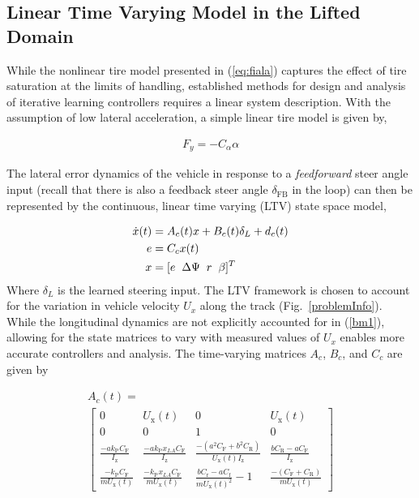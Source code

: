 \documentclass[letterpaper, 10 pt, conference]{ieeeconf}  %
\begin{document}
\subsection{Linear Time Varying Model in the Lifted Domain}

While the nonlinear tire model presented in (\ref{eq:fiala}) captures the effect of tire saturation at the limits of handling, established methods for design and analysis
of iterative learning controllers requires a linear system description. With the assumption of low lateral acceleration, a simple linear tire model is given by, 

\begin{align}
	F_y = -C_\alpha\alpha
\end{align}

The lateral error dynamics of the vehicle in response to a \textit{feedforward} steer angle input (recall that there is also a feedback steer angle $\delta_\mathrm{FB}$ in the loop)
 can then be represented by the continuous, linear time varying (LTV) state space model,

\begin{subequations}
\label{eq:cts}
\begin{align}
	\dot{x}(t) &= A_c(t) x + B_c(t)\delta_L + d_c(t)\\
	 e &= C_cx(t)\\
	 x &= [e \hspace{2mm} \Delta\Psi \hspace{2mm} r \hspace{2mm} \beta]^T
\end{align}
\end{subequations}
Where $\delta_L$ is the learned steering input. The LTV framework is chosen to account for the variation in vehicle 
velocity $U_x$ along the track (Fig.~\ref{problemInfo}). While the longitudinal dynamics are not explicitly accounted for in (\ref{bm1}), 
allowing for the state matrices to vary with measured values of $U_x$ enables more accurate controllers and analysis. The time-varying matrices $A_c$, $B_c$, and $C_c$ are given by

\begin{multline}
\label{eqn:Amatrix}
A_c(t)  =  \\
\left[\begin{smallmatrix}
  0 & U_\mathrm{x}(t) & 0 & U_\mathrm{x}(t) \\ 
  0 & 0 & 1 & 0 \\ 
  \frac{-ak_\mathrm{P} C_\mathrm{F}}{I_\mathrm{z}}  & \frac{-ak_\mathrm{P}x_{LA}C_\mathrm{F}}{I_\mathrm{z}}  & \frac{-(a^2C_\mathrm{F}+b^2C_\mathrm{R})}{U_\mathrm{x}(t)I_\mathrm{z}} & \frac{bC_\mathrm{R} - aC_\mathrm{F}}{I_\mathrm{z}}  \\
  \frac{-k_\mathrm{P}C_\mathrm{F}}{mU_\mathrm{x}(t)}  & \frac{-k_\mathrm{P}x_{LA}C_\mathrm{F}}{mU_\mathrm{x}(t)}  & \frac{bC_\mathrm{r}-aC_\mathrm{f}}{mU_\mathrm{x}(t)^2}-1 & \frac{-(C_\mathrm{F} + C_\mathrm{R})}{mU_\mathrm{x}(t)}
 \end{smallmatrix}\right]
 \end{multline}
\end{document}
